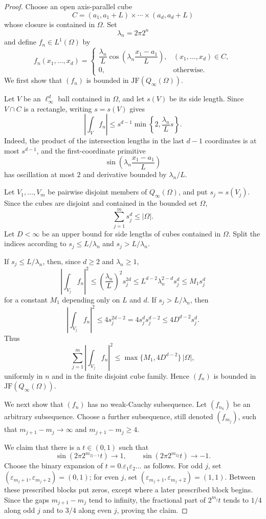 \documentclass[11pt]{article}
\newcommand{\JF}{\mathrm{JF}}
\begin{document}
\begin{proof}
Choose an open axis-parallel cube
\[
C=(a_1,a_1+L)\times\cdots\times(a_d,a_d+L)
\]
whose closure is contained in $\Omega$.  Set
\[
\lambda_n=2\pi 2^n
\]
and define $f_n\in L^1(\Omega)$ by
\[
f_n(x_1,\ldots,x_d)
=
\begin{cases}
\dfrac{\lambda_n}{L}
\cos\!\left(\lambda_n\dfrac{x_1-a_1}{L}\right),
& (x_1,\ldots,x_d)\in C,\\[6pt]
0, & \text{otherwise.}
\end{cases}
\]
We first show that $(f_n)$ is bounded in $\JF(Q_\infty(\Omega))$.

Let $V$ be an $\ell_\infty^d$ ball contained in $\Omega$, and let $s(V)$ be
its side length.  Since $V\cap C$ is a rectangle, writing $s=s(V)$ gives
\[
\left|\int_V f_n\right|
\leq
s^{d-1}\min\left\{2,\frac{\lambda_n}{L}s\right\}.
\]
Indeed, the product of the intersection lengths in the last $d-1$ coordinates
is at most $s^{d-1}$, and the first-coordinate primitive
\[
\sin\!\left(\lambda_n\frac{x_1-a_1}{L}\right)
\]
has oscillation at most $2$ and derivative bounded by $\lambda_n/L$.

Let $V_1,\ldots,V_m$ be pairwise disjoint members of $Q_\infty(\Omega)$, and
put $s_j=s(V_j)$.  Since the cubes are disjoint and contained in the bounded
set $\Omega$,
\[
\sum_{j=1}^m s_j^d\leq |\Omega|.
\]
Let $D<\infty$ be an upper bound for side lengths of cubes contained in
$\Omega$.  Split the indices according to $s_j\leq L/\lambda_n$ and
$s_j>L/\lambda_n$.

If $s_j\leq L/\lambda_n$, then, since $d\ge2$ and $\lambda_n\ge1$,
\[
\left|\int_{V_j}f_n\right|^2
\leq
\left(\frac{\lambda_n}{L}\right)^2s_j^{2d}
\leq
L^{d-2}\lambda_n^{2-d}s_j^d
\leq
M_1 s_j^d
\]
for a constant $M_1$ depending only on $L$ and $d$.  If $s_j>L/\lambda_n$,
then
\[
\left|\int_{V_j}f_n\right|^2
\leq
4s_j^{2d-2}
=4s_j^d s_j^{d-2}
\leq 4D^{d-2}s_j^d.
\]
Thus
\[
\sum_{j=1}^m\left|\int_{V_j}f_n\right|^2
\leq
\max\{M_1,4D^{d-2}\}\,|\Omega|,
\]
uniformly in $n$ and in the finite disjoint cube family.  Hence $(f_n)$ is
bounded in $\JF(Q_\infty(\Omega))$.

We next show that $(f_n)$ has no weak-Cauchy subsequence.  Let $(f_{n_k})$ be
an arbitrary subsequence.  Choose a further subsequence, still denoted
$(f_{m_j})$, such that $m_{j+1}-m_j\to\infty$ and $m_{j+1}-m_j\ge4$.

We claim that there is a $t\in(0,1)$ such that
\[
\sin(2\pi 2^{m_{2j-1}}t)\to 1,
\qquad
\sin(2\pi 2^{m_{2j}}t)\to -1.
\]
Choose the binary expansion of $t=0.\varepsilon_1\varepsilon_2\ldots$ as
follows.  For odd $j$, set
$(\varepsilon_{m_j+1},\varepsilon_{m_j+2})=(0,1)$; for even $j$, set
$(\varepsilon_{m_j+1},\varepsilon_{m_j+2})=(1,1)$.  Between these prescribed
blocks put zeros, except where a later prescribed block begins.  Since the
gaps $m_{j+1}-m_j$ tend to infinity, the fractional part of $2^{m_j}t$ tends
to $1/4$ along odd $j$ and to $3/4$ along even $j$, proving the claim.


\end{proof}
\end{document}

